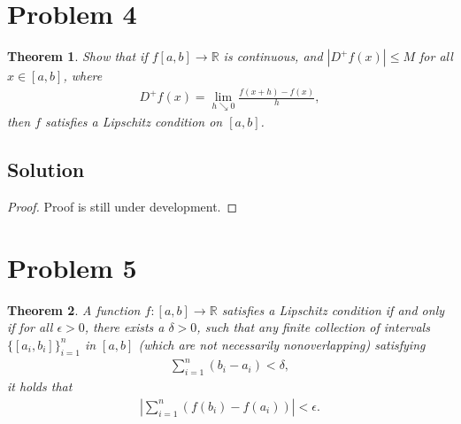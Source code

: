 \documentclass[10pt,a4paper]{article}
\theoremstyle{theorem}
\newtheorem{theorem}{Theorem}
\theoremstyle{definition}
\begin{document}
\section*{Problem 4}
\begin{theorem}
Show that if $f[a, b] \to \mathbb{R}$ is continuous, and $|D^+ f(x)| \leq M$ for all $x \in [a, b]$, where
\begin{align*}
D^+ f(x) = \lim_{h \searrow 0} \frac{f(x + h) - f(x)}{h},
\end{align*}
then $f$ satisfies a Lipschitz condition on $[a, b]$.
\end{theorem}

\subsection*{Solution}
\begin{proof}
Proof is still under development.
\end{proof}

\section*{Problem 5} 
\begin{theorem}
A function $f:[a, b] \to \mathbb{R}$ satisfies a Lipschitz condition if and only if for all $\epsilon > 0$, there exists a $\delta > 0$, such that any finite collection of intervals $\{[a_i, b_i] \}_{i=1}^n$ in $[a, b]$ (which are not necessarily nonoverlapping) satisfying 
\begin{align*}
\sum_{i=1}^n (b_i - a_i) < \delta,
\end{align*}
it holds that 
\begin{align*}
\left|\sum_{i=1}^n (f(b_i) - f(a_i))\right| < \epsilon.
\end{align*}
\end{theorem}
\end{document}
